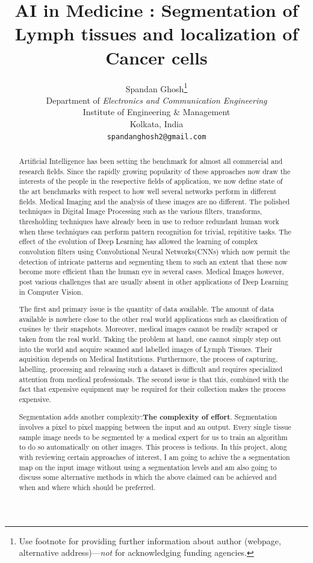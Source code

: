\documentclass[19pt]{article}
\title{AI in Medicine : Segmentation of Lymph tissues and localization of Cancer cells}
\author{
  Spandan Ghosh\thanks{Use footnote for providing further
    information about author (webpage, alternative
    address)---\emph{not} for acknowledging funding agencies.} \\
    Department of \emph{Electronics and Communication Engineering}\\
  Institute of Engineering \& Management\\
  Kolkata, India \\
  \texttt{spandanghosh2@gmail.com} \\
}
\begin{document}
\maketitle

\begin{abstract}
    Artificial Intelligence has been setting the benchmark for almost all commercial and research fields. Since the rapidly growing popularity of these approaches now draw the interests of the people in the resepective fields of application, we now define state of the art benchmarks with respect to how well several networks perform in different fields. Medical Imaging and the analysis of these images are no different. The polished techniques in Digital Image Processing such as the various filters, transforms, thresholding techniques have already been in use to reduce redundant human work when these techniques can perform pattern recognition for trivial, repititive tasks. The effect of the evolution of Deep Learning has allowed the learning of complex convolution filters using Convolutional Neural Networks(CNNs) which now permit the detection of intricate patterns and segmenting them to such an extent that these now become more efficient than the human eye in several cases. Medical Images however, post various challenges that are usually absent in other applications of Deep Learning in Computer Vision. 

    The first and primary issue is the quantity of data available. The amount of data available is nowhere close to the other real world applications such as classification of cusines by their snapshots. Moreover, medical images cannot be readily scraped or taken from the real world. Taking the problem at hand, one cannot simply step out into the world and acquire scanned and labelled images of Lymph Tissues. Their aquisition depends on Medical Institutions. Furthermore, the process of capturing, labelling, processing and releasing such a dataset is difficult and requires specialized attention from medical professionals. The second issue is that this, combined with the fact that expensive equipment may be required for their collection makes the process expensive.

    Segmentation adds another complexity:\textbf{The complexity of effort}. Segmentation involves a pixel to pixel mapping between the input and an output. Every single tissue sample image needs to be segmented by a medical expert for us to train an algorithm to do so automatically on other images. This process is tedious. In this project, along with reviewing certain approaches of interest, I am going to achive the a segmentation map on the input image without using a segmentation levels and am also going to discuss some alternative methods in which the above claimed can be achieved and when and where which should be preferred.
    
\end{abstract}
\newpage
    \tableofcontents
\newpage
\end{document}
